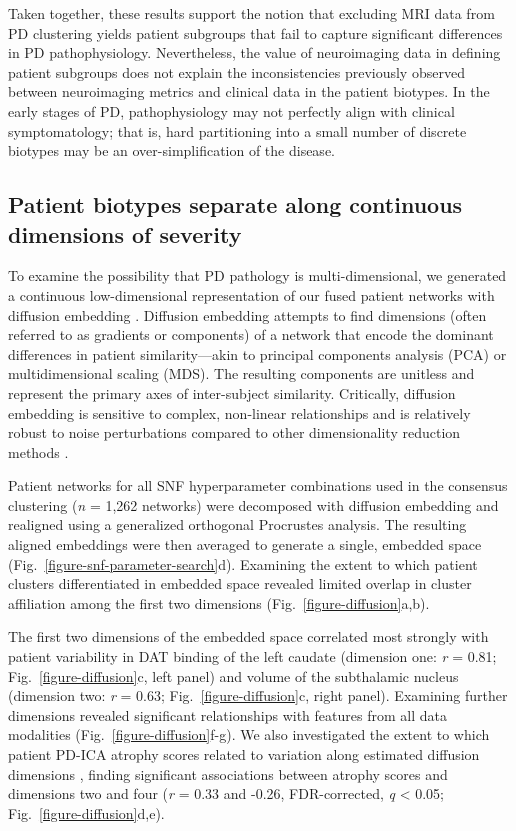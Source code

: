 \documentclass[12pt,aps,pra,reprint,showkeys]{revtex4-1}
\begin{document}
Taken together, these results support the notion that excluding MRI data from PD clustering yields patient subgroups that fail to capture significant differences in PD pathophysiology.
Nevertheless, the value of neuroimaging data in defining patient subgroups does not explain the inconsistencies previously observed between neuroimaging metrics and clinical data in the patient biotypes.
In the early stages of PD, pathophysiology may not perfectly align with clinical symptomatology; that is, hard partitioning into a small number of discrete biotypes may be an over-simplification of the disease.

\subsection*{Patient biotypes separate along continuous dimensions of severity}

To examine the possibility that PD pathology is multi-dimensional, we generated a continuous low-dimensional representation of our fused patient networks with diffusion embedding \citep{coifman2005geometric, lafon2006diffusion}.
Diffusion embedding attempts to find dimensions (often referred to as gradients or components) of a network that encode the dominant differences in patient similarity---akin to principal components analysis (PCA) or multidimensional scaling (MDS).
The resulting components are unitless and represent the primary axes of inter-subject similarity.
Critically, diffusion embedding is sensitive to complex, non-linear relationships and is relatively robust to noise perturbations compared to other dimensionality reduction methods \citep{coifman2005geometric, lafon2006diffusion}.

Patient networks for all SNF hyperparameter combinations used in the consensus clustering (\emph{n} = 1,262 networks) were decomposed with diffusion embedding and realigned using a generalized orthogonal Procrustes analysis.
The resulting aligned embeddings were then averaged to generate a single, embedded space (Fig.~\ref{figure-snf-parameter-search}d).
Examining the extent to which patient clusters differentiated in embedded space revealed limited overlap in cluster affiliation among the first two dimensions (Fig.~\ref{figure-diffusion}a,b).

The first two dimensions of the embedded space correlated most strongly with patient variability in DAT binding of the left caudate (dimension one: \emph{r} = 0.81; Fig.~\ref{figure-diffusion}c, left panel) and volume of the subthalamic nucleus (dimension two: \emph{r} = 0.63; Fig.~\ref{figure-diffusion}c, right panel).
Examining further dimensions revealed significant relationships with features from all data modalities (Fig.~\ref{figure-diffusion}f-g).
We also investigated the extent to which patient PD-ICA atrophy scores related to variation along estimated diffusion dimensions \citep{zeighami2015network}, finding significant associations between atrophy scores and dimensions two and four (\emph{r} = 0.33 and -0.26, FDR-corrected, \emph{q} < 0.05; Fig.~\ref{figure-diffusion}d,e).
\end{document}
